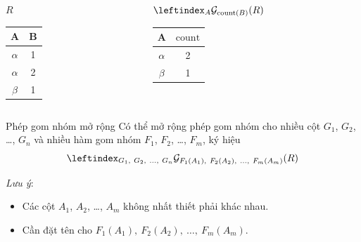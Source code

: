 \documentclass[11pt]{beamer}
\begin{document}
  \begin{frame}
    \begin{columns}[T]
      \begin{column}{0.4\textwidth}
        \centering $R$
        \bigskip \\
        \begin{tabular}{|c|c|}
          \hline
          $\textbf{A}$ & $\textbf{B}$ \\[0.5ex] \hline\hline
          $\alpha$ & 1 \\ \hline
          $\alpha$ & 2 \\ \hline
          $\beta$ & 1 \\ \hline
        \end{tabular}
      \end{column}
      \begin{column}{0.6\textwidth}
        \centering $\leftindex_{A}{\mathcal{G}}_{\mathrm{count}(B)} (R)$
        \medskip \\
        \begin{tabular}{|c|c|}
          \hline
          $\textbf{A}$ & $\mathrm{count}$ \\[0.5ex] \hline\hline
          $\alpha$ & 2 \\ \hline
          $\beta$ & 1 \\ \hline
        \end{tabular}
      \end{column}
    \end{columns}
  \end{frame}
  \begin{frame}{Phép gom nhóm mở rộng}
    Có thể mở rộng phép gom nhóm cho nhiều cột $G_1$, $G_2$, \dots, $G_n$ và 
    nhiều hàm gom nhóm $F_1$, $F_2$, \dots, $F_m$, ký hiệu
    $$
    \leftindex_{G_1,\ G_2,\ \dots,\ G_n}{\mathcal{G}}_{F_1(A_1),\ F_2(A_2),\ \dots,\ F_m(A_m)} (R)
    $$
  \end{frame}
  \begin{frame}
    \textit{Lưu ý}:
    \begin{itemize}
      \item Các cột $A_1$, $A_2$, \dots, $A_m$ không nhất thiết phải khác nhau.
      \item Cần đặt tên cho $F_1(A_1),\ F_2(A_2),\ \dots,\ F_m(A_m)$.
    \end{itemize} 
  \end{frame}
\end{document}
